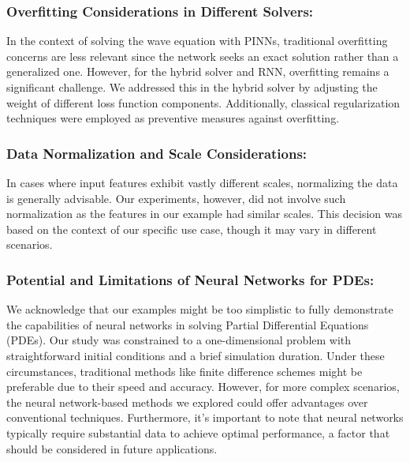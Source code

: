 \documentclass[twoside,11pt]{report}
\begin{document}
    \subsubsection{Overfitting Considerations in Different Solvers:}
    In the context of solving the wave equation with PINNs, traditional overfitting concerns are less relevant 
    since the network seeks an exact solution rather than a generalized one. However, for the hybrid solver and RNN, 
    overfitting remains a significant challenge. We addressed this in the hybrid solver by adjusting the weight of 
    different loss function components. Additionally, classical regularization techniques were employed as 
    preventive measures against overfitting.

    \subsubsection{Data Normalization and Scale Considerations:}
    In cases where input features exhibit vastly different scales, normalizing the data is generally advisable. 
    Our experiments, however, did not involve such normalization as the features in our example had similar scales. 
    This decision was based on the context of our specific use case, though it may vary in different scenarios.

    \subsubsection{Potential and Limitations of Neural Networks for PDEs:}
    We acknowledge that our examples might be too simplistic to fully demonstrate the capabilities of neural 
    networks in solving Partial Differential Equations (PDEs). Our study was constrained to a one-dimensional 
    problem with straightforward initial conditions and a brief simulation duration. Under these circumstances, 
    traditional methods like finite difference schemes might be preferable due to their speed and accuracy. However, 
    for more complex scenarios, the neural network-based methods we explored could offer advantages over 
    conventional techniques. Furthermore, it's important to note that neural networks typically require 
    substantial data to achieve optimal performance, a factor that should be considered in future applications.
\end{document}

